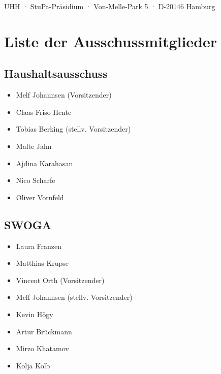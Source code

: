 \documentclass[ngerman,headheight=70pt]{scrartcl}
\begin{document}
    UHH · StuPa-Präsidium · Von-Melle-Park 5 · D-20146 Hamburg

    \section*{Liste der Ausschussmitglieder}

    \begin{multicols}{2}
    \subsection*{Haushaltsausschuss}
    \begin{itemize}
        \item Melf Johannsen (Vorsitzender)
        \item Claas-Friso Hente
        \item Tobias Berking (stellv. Vorsitzender)
        \item Malte Jahn
        \item Ajdina Karahasan
        \item Nico Scharfe
        \item Oliver Vornfeld
    \end{itemize}

    \subsection*{SWOGA}
    \begin{itemize}
        \item Laura Franzen
        \item Matthias Krupse
        \item Vincent Orth (Vorsitzender)
        \item Melf Johannsen (stellv. Vorsitzender)
        \item Kevin Högy
        \item Artur Brückmann
        \item Mirzo Khatamov
        \item Kolja Kolb
    \end{itemize}

\end{multicols}
\end{document}
